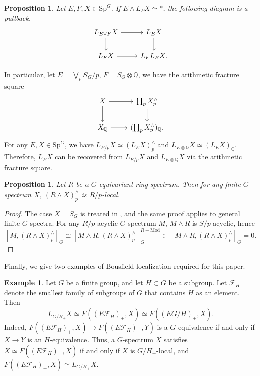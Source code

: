 \documentclass{amsart}
\theoremstyle{plain}
\newtheorem{proposition}[theorem]{Proposition}
\theoremstyle{definition}
\newtheorem{example}[theorem]{Example}
\theoremstyle{remark}
\begin{document}
\begin{proposition}\cite{bauer2011bousfield}\label{prop:arithmetic square}
    Let $E,F,X\in \mathrm{Sp}^G$. If $E\wedge L_F X\simeq \ast$, the following diagram is a pullback.
    \[
        \begin{tikzcd}
        L_{E\vee F}X \arrow[r] \arrow[d] & L_E X \arrow[d] \\
        L_F X \arrow[r] & L_F L_E X.
        \end{tikzcd}
    \]
\end{proposition}
In particular, let $E=\bigvee_p S_G/p$, $F=S_G\otimes\mathbb{Q}$, we have the arithmetic fracture square
    \[
        \begin{tikzcd}
        X \arrow[r] \arrow[d] & \prod_{p} X_{p}^{\wedge} \arrow[d] \\
        X_{\mathbb{Q}} \arrow[r] & (\prod_{p} X_{p}^{\wedge})_{\mathbb{Q}} .
        \end{tikzcd}
    \]
For any $E,X\in \mathrm{Sp}^G$, we have $L_{E/p}X\simeq (L_E X)_p^\wedge$ and $L_{E\otimes \mathbb{Q}}X\simeq (L_E X)_{\mathbb{Q}}$.
Therefore, $L_E X$ can be recovered from $L_{E/p}X$ and $L_{E\otimes \mathbb{Q}}X$ via the arithmetic fracture square.
  
\begin{proposition}\label{prop:mod p local}\cite[Lemma 6.2]{bonventre2022ku_g}
    Let $R$ be a $G$-equivariant ring spectrum. Then for any finite $G$-spectrum $X$, $(R\wedge X)_p^{\wedge}$ is $R/p$-local.
\end{proposition}
\begin{proof}
    The case $X=S_G$ is treated in \cite[Lemma 6.2]{bonventre2022ku_g}, and the same proof applies to general finite $G$-spectra. For any $R/p$-acyclic $G$-spectrum $M$, $M \wedge R$ is $S/p$-acyclic, hence
    \[ [M,(R\wedge X)_p^{\wedge}]_G\cong [M\wedge R,(R\wedge X)_p^{\wedge}]_{G}^{R-\mathrm{Mod}}\subset [M\wedge R,(R\wedge X)_p^{\wedge}]_G=0.\]
\end{proof}

Finally, we give two examples of Bousfield localization required for this paper.

\begin{example}
Let $G$ be a finite group, and let $H\subset G$ be a subgroup. Let $\mathcal{F}_H$ denote the smallest family of subgroups of $G$ that contains $H$ as an element. Then 
\[L_{G/H_+}X \simeq F((E\mathcal{F}_H)_+, X)\simeq F((EG/H)_+, X).\]
Indeed, $F((E\mathcal{F}_H)_+, X) \to F((E\mathcal{F}_H)_+, Y)$ is a $G$-equivalence if and only if $X \to Y$ is an $H$-equivalence. Thus, a $G$-spectrum $X$ satisfies $X \simeq F((E\mathcal{F}_H)_+, X)$ if and only if $X$ is $G/H_+$-local, and $F((E\mathcal{F}_H)_+, X) \simeq L_{G/H_+} X$. 
\end{example}
\end{document}

